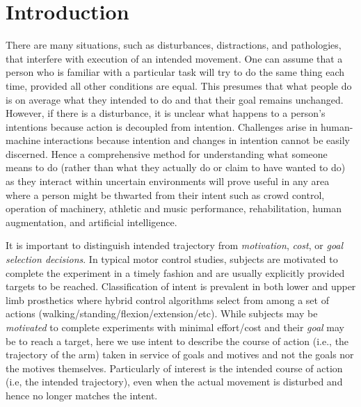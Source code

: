 


\section*{Introduction}
There are many situations, such as disturbances, distractions, and pathologies, that interfere with execution of an intended movement. One can assume that a person who is familiar with a particular task will try to do the same thing each time, provided all other conditions are equal. This presumes that what people do is on average what they intended to do and that their goal remains unchanged. However, if there is a disturbance, it is unclear what happens to a person's intentions because action is decoupled from intention. Challenges arise in human-machine interactions because intention and changes in intention cannot be easily discerned. Hence a comprehensive method for understanding what someone means to do (rather than what they actually do or claim to have wanted to do) as they interact within uncertain environments will prove useful in any area where a person might be thwarted from their intent such as crowd control, operation of machinery, athletic and music performance, rehabilitation, human augmentation, and artificial intelligence.

It is important to distinguish intended trajectory from \textit{motivation}\cite{mcclelland1985motives, rawolle2013relationships}, \textit{cost}\cite{todorov2002optimal, flash1985coordination}, or \textit{goal selection decisions}\cite{ziebart2010modeling}. In typical motor control studies, subjects are motivated to complete the experiment in a timely fashion and are usually explicitly provided targets to be reached. Classification of intent is prevalent in both lower \cite{strausser2011development, hargrove2013robotic} and upper limb\cite{englehart2003robust, young2012improving} prosthetics where hybrid control algorithms select from among a set of actions (walking/standing/flexion/extension/etc). While subjects may be \textit{motivated} to complete experiments with minimal effort/cost and their \textit{goal} may be to reach a target, here we use intent to describe the course of action (i.e., the trajectory of the arm) taken in service of goals and motives and not the goals nor the motives themselves. Particularly of interest is the intended course of action (i.e, the intended trajectory), even when the actual movement is disturbed and hence no longer matches the intent.

